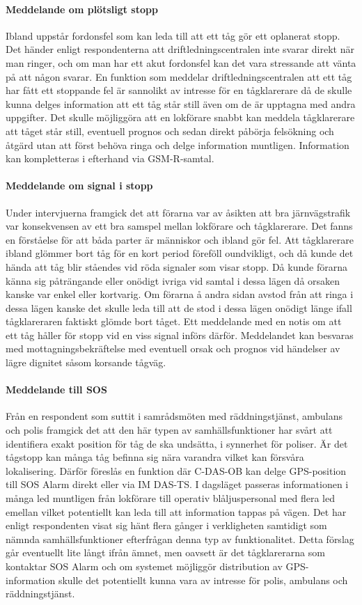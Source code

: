 \paragraph{Meddelande om plötsligt stopp}
Ibland uppstår fordonsfel som kan leda till att ett tåg gör ett oplanerat stopp.
Det händer enligt respondenterna att driftledningscentralen inte svarar direkt när man ringer, och om man har ett akut fordonsfel kan det vara stressande att vänta på att någon svarar.
En funktion som meddelar driftledningscentralen att ett tåg har fått ett stoppande fel är sannolikt av intresse för en tågklarerare då de skulle kunna delges information att ett tåg står still även om de är upptagna med andra uppgifter.
Det skulle möjliggöra att en lokförare snabbt kan meddela tågklarerare att tåget står still, eventuell prognos och sedan direkt påbörja felsökning och åtgärd utan att först behöva ringa och delge information muntligen.
Information kan kompletteras i efterhand via GSM-R-samtal.
\paragraph{Meddelande om signal i stopp}
Under intervjuerna framgick det att förarna var av åsikten att bra järnvägstrafik var konsekvensen av ett bra samspel mellan lokförare och tågklarerare.
Det fanns en förståelse för att båda parter är människor och ibland gör fel.
Att tågklarerare ibland glömmer bort tåg för en kort period föreföll oundvikligt, och då kunde det hända att tåg blir ståendes vid röda signaler som visar stopp.
Då kunde förarna känna sig påträngande eller onödigt ivriga vid samtal i dessa lägen då orsaken kanske var enkel eller kortvarig.
Om förarna å andra sidan avstod från att ringa i dessa lägen kanske det skulle leda till att de stod i dessa lägen onödigt länge ifall tågklareraren faktiskt glömde bort tåget.
Ett meddelande med en notis om att ett tåg håller för stopp vid en viss signal införs därför.
Meddelandet kan besvaras med mottagningsbekräftelse med eventuell orsak och prognos vid händelser av lägre dignitet såsom korsande tågväg.
\paragraph{Meddelande till SOS}
Från en respondent som suttit i samrådsmöten med räddningstjänst, ambulans och polis framgick det att den här typen av samhällsfunktioner har svårt att identifiera exakt position för tåg de ska undsätta, i synnerhet för poliser.
Är det tågstopp kan många tåg befinna sig nära varandra vilket kan försvåra lokalisering.
Därför föreslås en funktion där C-DAS-OB kan delge GPS-position till SOS Alarm direkt eller via IM DAS-TS\@.
I dagsläget passeras informationen i många led muntligen från lokförare till operativ blåljuspersonal med flera led emellan vilket potentiellt kan leda till att information tappas på vägen.
Det har enligt respondenten visat sig hänt flera gånger i verkligheten samtidigt som nämnda samhällsfunktioner efterfrågan denna typ av funktionalitet.
Detta förslag går eventuellt lite långt ifrån ämnet, men oavsett är det tågklarerarna som kontaktar SOS Alarm och om systemet möjliggör distribution av GPS-information skulle det potentiellt kunna vara av intresse för polis, ambulans och räddningstjänst.
